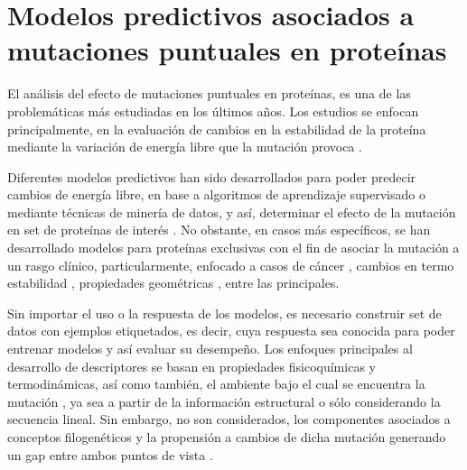 
\chapter{Modelos predictivos asociados a mutaciones puntuales en proteínas}

\ifpdf
    \graphicspath{{Chapter2/Figs/Raster/}{Chapter2/Figs/PDF/}{Chapter2/Figs/}}
\else
    \graphicspath{{Chapter2/Figs/Vector/}{Chapter2/Figs/}}
\fi

El análisis del efecto de mutaciones puntuales en proteínas, es una de las problemáticas más estudiadas en los últimos años. Los estudios se enfocan principalmente, en la evaluación de cambios en la estabilidad de la proteína mediante la variación de energía libre que la mutación provoca \cite{Schymkowitz2005,Pandurangan2017,rohl2004protein,Parthiban2006}. 

Diferentes modelos predictivos han sido desarrollados para poder predecir cambios de energía libre, en base a algoritmos de aprendizaje supervisado o mediante técnicas de minería de datos, y así, determinar el efecto de la mutación en set de proteínas de interés \cite{Quan2016,Capriotti2008,Broom2017,Khan2010,vaisman,Getov2016,Capriotti2005}. No obstante, en casos más específicos, se han desarrollado modelos para proteínas exclusivas con el fin de asociar la mutación a un rasgo clínico, particularmente, enfocado a casos de cáncer \cite{article, Forbes2010}, cambios en termo estabilidad \cite{Tian2010}, propiedades geométricas \cite{Barenboim2008}, entre las principales.

Sin importar el uso o la respuesta de los modelos, es necesario construir set de datos con ejemplos etiquetados, es decir, cuya respuesta sea conocida para poder entrenar modelos y así evaluar su desempeño. Los enfoques principales al desarrollo de descriptores se basan en propiedades fisicoquímicas y termodinámicas, así como también, el ambiente bajo el cual se encuentra la mutación \cite{Capriotti2005}, ya sea a partir de la información estructural o sólo considerando la secuencia lineal. Sin embargo, no son considerados, los componentes asociados a conceptos filogenéticos y la propensión a cambios de dicha mutación generando un gap entre ambos puntos de vista \cite{Olivera-Nappa2011}.

